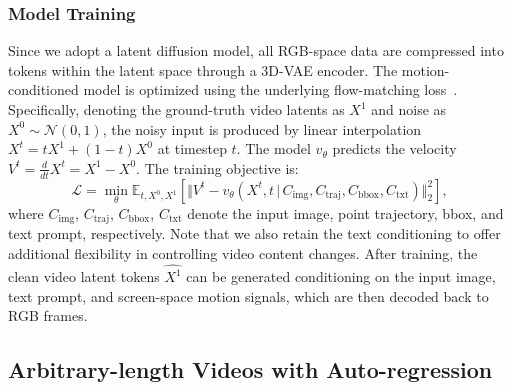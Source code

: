 \subsubsection{Model Training}
Since we adopt a latent diffusion model, all RGB-space data are compressed into tokens within the latent space through a 3D-VAE encoder. The motion-conditioned model is optimized using the underlying flow-matching loss~\cite{lipmanflow,liu2023instaflow}. Specifically, denoting the ground-truth video latents as $X^1$ and noise as $X^0\sim\mathcal{N}(0,1)$, the noisy input is produced by linear interpolation $X^t=t X^1+(1-t)X^0$ at timestep $t$. The model $v_{\theta}$ predicts the velocity $V^t=\frac{d}{dt}X^t=X^1-X^0$. The training objective is:
\begin{equation}
    \mathcal{L} = \min _{\theta} \mathbb{E}_{t,X^0,X^1} \left[\Vert V^t -v_{\theta}(X^t,t \,|\, C_\text{img},C_\text{traj},C_\text{bbox},C_\text{txt})   \Vert_2^2 \right],
\end{equation}
where $C_\text{img}$, $C_\text{traj}$, $C_\text{bbox}$, $C_\text{txt}$ denote the input image, point trajectory, bbox, and text prompt, respectively.
Note that we also retain the text conditioning to offer additional flexibility in controlling video content changes. After training, the clean video latent tokens $\hat{X^1}$ can be generated conditioning on the input image, text prompt, and screen-space motion signals, which are then decoded back to RGB frames.


\subsection{Arbitrary-length Videos with Auto-regression}

